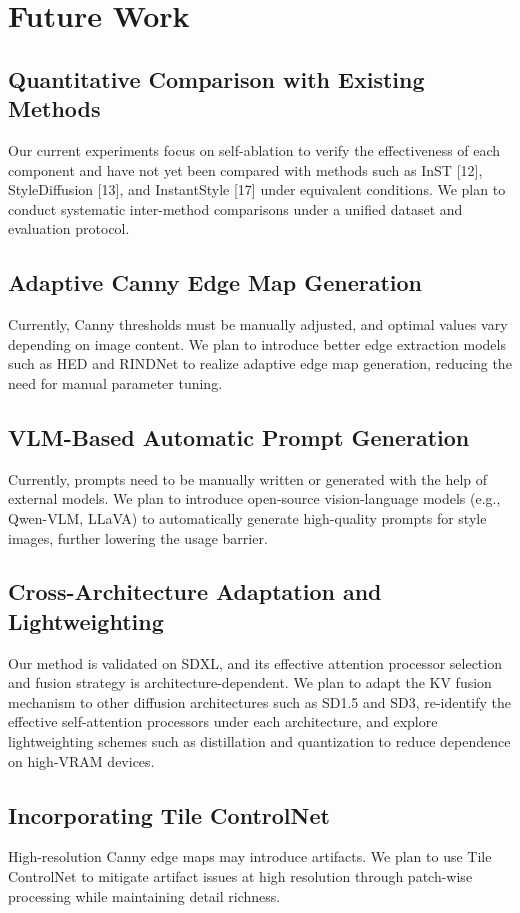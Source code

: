 \documentclass[10pt,twocolumn]{article}
\begin{document}
\section{Future Work}

\subsection{Quantitative Comparison with Existing Methods}
Our current experiments focus on self-ablation to verify the effectiveness of each component and have not yet been compared with methods such as InST [12], StyleDiffusion [13], and InstantStyle [17] under equivalent conditions. We plan to conduct systematic inter-method comparisons under a unified dataset and evaluation protocol.

\subsection{Adaptive Canny Edge Map Generation}
Currently, Canny thresholds must be manually adjusted, and optimal values vary depending on image content. We plan to introduce better edge extraction models such as HED and RINDNet to realize adaptive edge map generation, reducing the need for manual parameter tuning.

\subsection{VLM-Based Automatic Prompt Generation}
Currently, prompts need to be manually written or generated with the help of external models. We plan to introduce open-source vision-language models (e.g., Qwen-VLM, LLaVA) to automatically generate high-quality prompts for style images, further lowering the usage barrier.

\subsection{Cross-Architecture Adaptation and Lightweighting}
Our method is validated on SDXL, and its effective attention processor selection and fusion strategy is architecture-dependent. We plan to adapt the KV fusion mechanism to other diffusion architectures such as SD1.5 and SD3, re-identify the effective self-attention processors under each architecture, and explore lightweighting schemes such as distillation and quantization to reduce dependence on high-VRAM devices.

\subsection{Incorporating Tile ControlNet}
High-resolution Canny edge maps may introduce artifacts. We plan to use Tile ControlNet to mitigate artifact issues at high resolution through patch-wise processing while maintaining detail richness.
\end{document}
